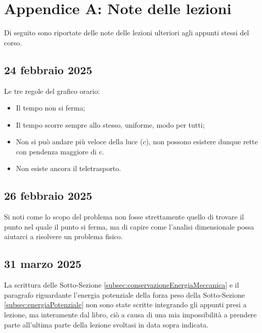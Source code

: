 \appendix 
\renewcommand{\thesection}{A.\arabic{section}}
\chapter{Appendice A: Note delle lezioni}
Di seguito sono riportate delle note delle lezioni ulteriori agli appunti stessi del corso.

\section{24 febbraio 2025}
\label{lez:24-02-2025}
Le tre regole del grafico orario:
\begin{itemize}
    \item Il tempo non si ferma;
    \item Il tempo scorre sempre allo stesso, uniforme, modo per tutti;
    \item Non si può andare più veloce della luce ($c$), non possono esistere dunque rette con pendenza maggiore di $c$.
    \item Non esiste ancora il teletrasporto.
\end{itemize}
\section{26 febbraio 2025}
\label{lez:26-02-2025}
Si noti come lo scopo del problema non fosse strettamente quello di trovare il punto nel quale il punto si ferma, ma di capire come l'analisi dimensionale possa aiutarci a risolvere un problema fisico.

\section{31 marzo 2025}
\label{lez:31-03-2025}
La scrittura delle Sotto-Sezione \ref{subsec:conservazioneEnergiaMeccanica} e il paragrafo riguardante l'energia potenziale della forza peso della Sotto-Sezione \ref{subsec:energiaPotenziale} non sono state scritte integrando gli appunti presi a lezione, ma interamente dal libro, ciò a causa di una mia impossibilità a prendere parte all'ultima parte della lezione svoltasi in data sopra indicata.